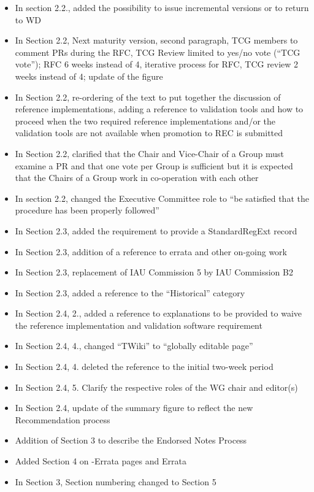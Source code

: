 \documentclass[11pt,a4paper]{ivoa}
\begin{document}
\begin{itemize}
to return the document to WD
\item In section 2.2., added the possibility to issue incremental versions or
to return to WD
\item In Section 2.2, Next maturity version, second paragraph, TCG members to
comment PRs during the RFC, TCG Review limited to yes/no vote (“TCG
vote”); RFC 6 weeks instead of 4, iterative process for RFC, TCG review
2 weeks instead of 4; update of the figure
\item In Section 2.2, re-ordering of the text to put together the discussion
of reference implementations, adding a reference to validation tools and
how to proceed when the two required reference implementations and/or
the validation tools are not available when promotion to REC is
submitted
\item In Section 2.2, clarified that the Chair and Vice-Chair of a Group must
examine a PR and that one vote per Group is sufficient but it is
expected that the Chairs of a Group work in co-operation with each other
\item In section 2.2, changed the Executive Committee role to “be satisfied
that the procedure has been properly followed”
\item In Section 2.3, added the requirement to provide a StandardRegExt record
\item In Section 2.3, addition of a reference to errata and other on-going work
\item In Section 2.3, replacement of IAU Commission 5 by IAU Commission B2
\item In Section 2.3, added a reference to the “Historical” category
\item In Section 2.4, 2., added a reference to explanations to be provided to
waive the reference implementation and validation software requirement
\item In Section 2.4, 4., changed “TWiki” to “globally editable page”
\item In Section 2.4, 4. deleted the reference to the initial two-week period
\item In Section 2.4, 5. Clarify the respective roles of the WG chair and editor(s)
\item In Section 2.4, update of the summary figure to reflect the new Recommendation
process
\item  Addition of Section 3 to describe the Endorsed Notes Process
\item  Added Section 4 on -Errata pages and Errata
\item In Section 3, Section numbering changed to Section 5

\end{itemize}
\end{document}
